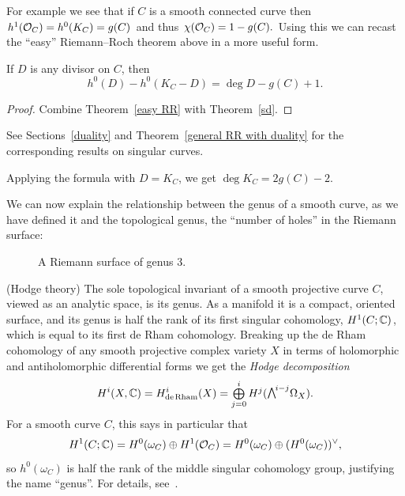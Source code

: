 For example we see that if $C$ is a smooth connected curve then $h^1 ({\mathcal O}_C) = h^0(K_C) = g(C)$ and thus $\chi({\mathcal O}_C) = 1-g(C).$   
Using this we can recast the ``easy'' 
Riemann--Roch theorem above in a more useful form. 

\begin{theorem}\label{RR theorem}
If $D$ is any divisor on $C$, then 
$$
h^0(D) - h^0(K_C -D) = \deg D - g(C) +1.
$$
\end{theorem}

\begin{proof}
Combine Theorem~\ref{easy RR} with Theorem~\ref{sd}.
\end{proof}

See Sections~\ref{duality} and Theorem~\ref{general RR with duality} for the corresponding results on singular curves.

Applying the formula with $D = K_C$, we get 
$\deg K_C = 2g(C) -2$.

We can now explain the relationship between the genus of a smooth curve, as we have defined it and the 
topological genus, the ``number of holes'' in the Riemann surface:


\begin{figure}   %
\vskip-20pt
\vskip-15pt
\caption{A Riemann surface of genus 3.
}
\label{RiemannSurface}
\end{figure}


\begin{fact} (Hodge theory)
The sole topological invariant of a smooth projective curve $C$,
viewed as an analytic space, is its genus. As a manifold it is a
compact, oriented surface, and its genus is half the rank of its first
singular cohomology, $H^{1}(C; {\mathbb C})$, which is equal to its first 
de Rham 
cohomology.
Breaking up the de Rham cohomology of any smooth projective complex variety $X$ in terms of holomorphic and antiholomorphic differential
forms we get the \emph{Hodge decomposition}
$$
H^i(X,\CC) = H^i_{\mathrm{de\,Rham}}(X) = 
\tsty\bigoplus\limits_{j=0}^i H^j(\mwedge^{i-j} \Omega_X).
$$
For a smooth curve $C$, this says in  particular that
$$
H^1(C; {\mathbb C}) = H^0(\omega_C)\oplus H^1({\mathcal O}_C) = H^0(\omega_C)\oplus (H^0(\omega_C))^\vee, 
$$
so $ h^0(\omega_C)$ is half the rank of the middle singular cohomology
group, justifying the name ``genus''. For details, 
see~\cite[p.\,116]{Griffiths-Harris1978}.
\end{fact}

